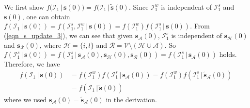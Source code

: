 \documentclass{IEEEtran}
\begin{document}
We first show $f(\mathcal{I}_1 \, | \, \mathbf{s}(0)) = f(\mathcal{I}_1 \, | \, \tilde{\mathbf{s}}(0)$. Since $\mathcal{I}_1^w$ is independent of $\mathcal{I}_1^s$ and $\mathbf{s}(0)$, one can obtain $f(\mathcal{I}_1 \, | \, \mathbf{s}(0)) = f(\mathcal{I}_1^s, \mathcal{I}_1^w \, | \, \mathbf{s}(0))= f(\mathcal{I}_1^w) f(\mathcal{I}_1^s \, | \, \mathbf{s}(0))$. From (\ref{eqn_s_update_3}), we can see that given $\mathbf{s}_{\mathcal{A}}(0)$, $\mathcal{I}_1^s$ is independent of $\mathbf{s}_{\mathcal{H}}(0)$ and $\mathbf{s}_{\mathcal{R}}(0)$, where $\mathcal{H}=\{i,l\}$ and $\mathcal{R}=\mathcal{V}\setminus (\mathcal{H} \cup \mathcal{A})$. So $f(\mathcal{I}_1^s \, | \, \mathbf{s}(0))= f(\mathcal{I}_1^s \, | \, \mathbf{s}_{\mathcal{A}}(0), \mathbf{s}_{\mathcal{H}}(0), \mathbf{s}_{\mathcal{R}}(0)) = f(\mathcal{I}_1^s \, | \, \mathbf{s}_{\mathcal{A}}(0))$ holds. Therefore, we have
\begin{equation}
	\begin{aligned}
		f(\mathcal{I}_1 \, | \, \mathbf{s}(0)) & = f(\mathcal{I}_1^w) f(\mathcal{I}_1^s \, | \, \mathbf{s}_{\mathcal{A}}(0)) = f(\mathcal{I}_1^w) f(\mathcal{I}_1^s \, | \, \tilde{\mathbf{s}}_{\mathcal{A}}(0)) \\
		& = f(\mathcal{I}_1 \, | \, \tilde{\mathbf{s}}(0))
	\end{aligned} 
\end{equation}
where we used $\mathbf{s}_{\mathcal{A}}(0)=\tilde{\mathbf{s}}_{\mathcal{A}}(0)$ in the derivation.
\end{document}
